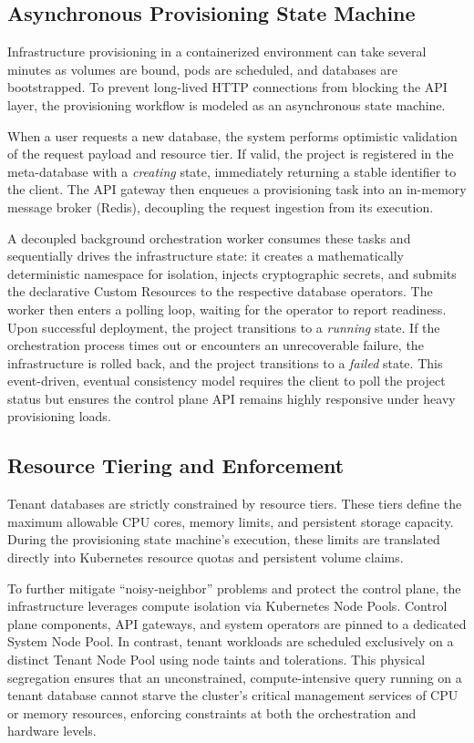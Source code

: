 \subsection{Asynchronous Provisioning State Machine}

Infrastructure provisioning in a containerized environment can take several minutes as volumes are bound, pods are scheduled, and databases are bootstrapped. To prevent long-lived HTTP connections from blocking the API layer, the provisioning workflow is modeled as an asynchronous state machine.

When a user requests a new database, the system performs optimistic validation of the request payload and resource tier. If valid, the project is registered in the meta-database with a \textit{creating} state, immediately returning a stable identifier to the client. The API gateway then enqueues a provisioning task into an in-memory message broker (Redis), decoupling the request ingestion from its execution.

A decoupled background orchestration worker consumes these tasks and sequentially drives the infrastructure state: it creates a mathematically deterministic namespace for isolation, injects cryptographic secrets, and submits the declarative Custom Resources to the respective database operators. The worker then enters a polling loop, waiting for the operator to report readiness. Upon successful deployment, the project transitions to a \textit{running} state. If the orchestration process times out or encounters an unrecoverable failure, the infrastructure is rolled back, and the project transitions to a \textit{failed} state. This event-driven, eventual consistency model requires the client to poll the project status but ensures the control plane API remains highly responsive under heavy provisioning loads.

\subsection{Resource Tiering and Enforcement}

Tenant databases are strictly constrained by resource tiers. These tiers define the maximum allowable CPU cores, memory limits, and persistent storage capacity. During the provisioning state machine's execution, these limits are translated directly into Kubernetes resource quotas and persistent volume claims. 

To further mitigate ``noisy-neighbor'' problems and protect the control plane, the infrastructure leverages compute isolation via Kubernetes Node Pools. Control plane components, API gateways, and system operators are pinned to a dedicated System Node Pool. In contrast, tenant workloads are scheduled exclusively on a distinct Tenant Node Pool using node taints and tolerations. This physical segregation ensures that an unconstrained, compute-intensive query running on a tenant database cannot starve the cluster's critical management services of CPU or memory resources, enforcing constraints at both the orchestration and hardware levels.

